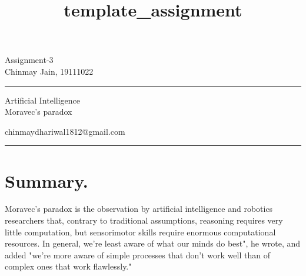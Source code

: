 \documentclass[a4paper,10pt]{article} %
\begin{document}

\title{template_assignment} %
\fancyhead[C]{}
\begin{minipage}{0.295\textwidth} %
\raggedright
Assignment-3\\ %
\footnotesize %
Chinmay Jain, 19111022 %
\medskip\hrule
\end{minipage}
\begin{minipage}{0.4\textwidth} %
\centering 
\large %
Artificial Intelligence\\ %
\normalsize %
Moravec's paradox\\ %
\end{minipage}
\begin{minipage}{0.295\textwidth} %
\raggedleft

\footnotesize %
chinmaydhariwal1812@gmail.com%
\medskip\hrule
\end{minipage}



\bigskip
\section{Summary.} 

Moravec's paradox is the observation by artificial intelligence and robotics researchers that, contrary to traditional assumptions, reasoning requires very little computation, but sensorimotor skills require enormous computational resources.
In general, we're least aware of what our minds do best", he wrote, and added "we're more aware of simple processes that don't work well than of complex ones that work flawlessly."
\end{document}
